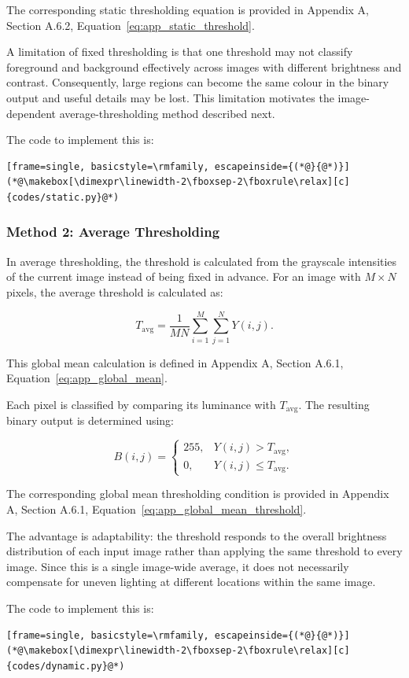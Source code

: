The corresponding static thresholding equation is provided in Appendix A, Section A.6.2, Equation~\hyperref[eq:app_static_threshold]{\ref*{eq:app_static_threshold}}.

A limitation of fixed thresholding is that one threshold may not classify foreground and background effectively across images with different brightness and contrast. Consequently, large regions can become the same colour in the binary output and useful details may be lost. This limitation motivates the image-dependent average-thresholding method described next.

The code to implement this is:
\begin{lstlisting}[frame=single, basicstyle=\rmfamily, escapeinside={(*@}{@*)}]
(*@\makebox[\dimexpr\linewidth-2\fboxsep-2\fboxrule\relax][c]{codes/static.py}@*)
\end{lstlisting}

\subsubsection{Method 2: Average Thresholding}

In average thresholding, the threshold is calculated from the grayscale intensities of the current image instead of being fixed in advance. For an image with $M\times N$ pixels, the average threshold is calculated as:

\begin{equation}
T_{\mathrm{avg}}=
\frac{1}{MN}
\sum_{i=1}^{M}
\sum_{j=1}^{N}
Y(i,j).
\end{equation}

This global mean calculation is defined in Appendix A, Section A.6.1, Equation~\hyperref[eq:app_global_mean]{\ref*{eq:app_global_mean}}.

Each pixel is classified by comparing its luminance with $T_{\mathrm{avg}}$. The resulting binary output is determined using:

\begin{equation}
B(i,j)=
\begin{cases}
255, & Y(i,j)>T_{\mathrm{avg}},\\
0, & Y(i,j)\leq T_{\mathrm{avg}}.
\end{cases}
\end{equation}

The corresponding global mean thresholding condition is provided in Appendix A, Section A.6.1, Equation~\hyperref[eq:app_global_mean_threshold]{\ref*{eq:app_global_mean_threshold}}.

The advantage is adaptability: the threshold responds to the overall brightness distribution of each input image rather than applying the same threshold to every image. Since this is a single image-wide average, it does not necessarily compensate for uneven lighting at different locations within the same image.

The code to implement this is:
\begin{lstlisting}[frame=single, basicstyle=\rmfamily, escapeinside={(*@}{@*)}]
(*@\makebox[\dimexpr\linewidth-2\fboxsep-2\fboxrule\relax][c]{codes/dynamic.py}@*)
\end{lstlisting}

